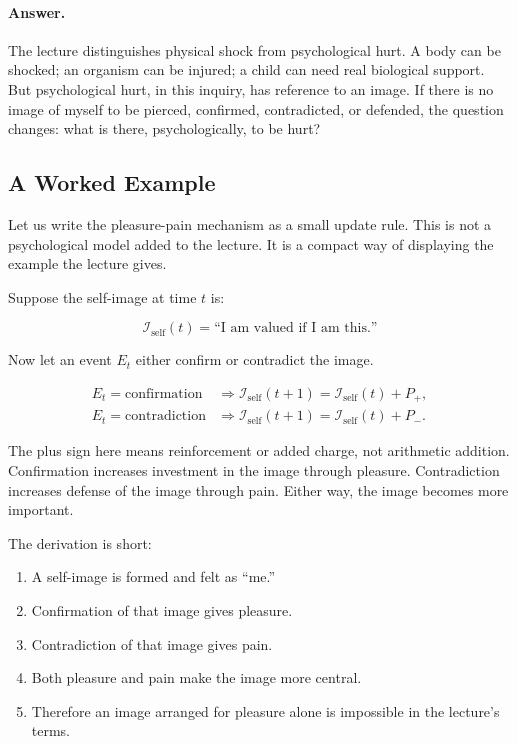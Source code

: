 \paragraph{Answer.}
The lecture distinguishes physical shock from psychological hurt. A body can be shocked; an organism can be injured; a child can need real biological support. But psychological hurt, in this inquiry, has reference to an image. If there is no image of myself to be pierced, confirmed, contradicted, or defended, the question changes: what is there, psychologically, to be hurt?

\subsection{A Worked Example}

Let us write the pleasure-pain mechanism as a small update rule. This is not a psychological model added to the lecture. It is a compact way of displaying the example the lecture gives.

Suppose the self-image at time \(t\) is:

\begin{equation}
\mathcal{I}_{\text{self}}(t)
=
\text{``I am valued if I am this.''}
\end{equation}

Now let an event \(E_t\) either confirm or contradict the image.

\begin{align}
E_t = \text{confirmation}
&\Rightarrow
\mathcal{I}_{\text{self}}(t+1)
=
\mathcal{I}_{\text{self}}(t) + P_{+}, \\
E_t = \text{contradiction}
&\Rightarrow
\mathcal{I}_{\text{self}}(t+1)
=
\mathcal{I}_{\text{self}}(t) + P_{-}.
\end{align}

The plus sign here means reinforcement or added charge, not arithmetic addition. Confirmation increases investment in the image through pleasure. Contradiction increases defense of the image through pain. Either way, the image becomes more important.

The derivation is short:

\begin{enumerate}
\item A self-image is formed and felt as ``me.''
\item Confirmation of that image gives pleasure.
\item Contradiction of that image gives pain.
\item Both pleasure and pain make the image more central.
\item Therefore an image arranged for pleasure alone is impossible in the lecture's terms.
\end{enumerate}

